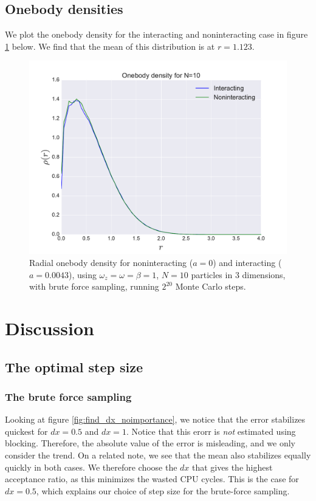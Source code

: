 \documentclass[a4paper, 10pt]{article}
\begin{document}
	\subsection{Onebody densities}
	We plot the onebody density for the interacting and noninteracting case in figure \ref{fig:results_onebody} below. We find that the mean of this distribution is at $r=1.123$.
		\begin{figure}[ht!]
			\centering
			\includegraphics[scale=0.8]{../Results/Onebody_density/onebody.pdf}
			\caption{Radial onebody density for noninteracting ($a=0$) and interacting ($a=0.0043$), using $\omega_z=\omega=\beta=1$, $N=10$ particles in $3$ dimensions, with brute force sampling, running $2^{20}$ Monte Carlo steps.}\label{fig:results_onebody}
		\end{figure}
	\section{Discussion}
	\subsection{The optimal step size}
	\subsubsection{The brute force sampling}\label{sec:Disc_optimal_step_size_brute_force}
	Looking at figure \ref{fig:find_dx_noimportance}, we notice that the error stabilizes quickest for $dx=0.5$ and $dx=1$. Notice that this erorr is \textit{not} estimated using blocking. Therefore, the absolute value of the error is misleading, and we only consider the trend. On a related note, we see that the mean also stabilizes equally quickly in both cases. We therefore choose the $dx$ that gives the highest acceptance ratio, as this minimizes the wasted CPU cycles. This is the case for $dx=0.5$, which explains our choice of step size for the brute-force sampling.
\end{document}
